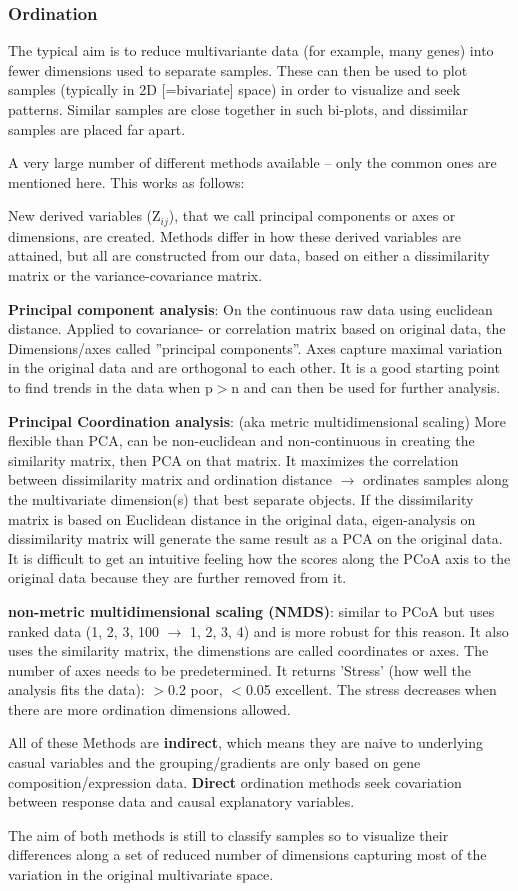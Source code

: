 \documentclass{article}
\begin{document}
\subsubsection{Ordination}
The typical aim is to reduce multivariante data (for example, many genes) into fewer dimensions used to separate samples. These can then be used to plot samples (typically in 2D [=bivariate] space) in order to visualize and seek patterns. Similar samples are close together in such bi-plots, and dissimilar samples are placed far apart. \par
A very large number of different methods available – only the common ones are mentioned here.
This works as follows:\par 
New derived variables (Z$_{ij}$), that we call principal components or axes or dimensions, are created. Methods differ in how these derived variables are attained, but all are constructed from our data, based on either a dissimilarity matrix or the variance-covariance matrix.\par
\textbf{Principal component analysis}: On the continuous raw data using euclidean distance. Applied to covariance- or correlation matrix based on original data, the Dimensions/axes called ”principal components”. Axes capture maximal variation in the original data and are orthogonal to each other.
It is a good starting point to find trends in the data when p$>$n and can then be used for further analysis.\par
\textbf{Principal Coordination analysis}: (aka metric multidimensional scaling) More flexible than PCA, can be non-euclidean and non-continuous in creating the similarity matrix, then PCA on that matrix. It maximizes the correlation between dissimilarity matrix and ordination distance $\rightarrow$ ordinates samples along the multivariate dimension(s) that best separate objects. If the dissimilarity matrix is based on Euclidean distance in the original data, eigen-analysis on dissimilarity matrix will generate the same result as a PCA on the original data. It is difficult to get an intuitive feeling how the scores along the PCoA axis to the original data because they are further removed from it.\par
\textbf{non-metric multidimensional scaling (NMDS)}: similar to PCoA but uses ranked data (1, 2, 3, 100 $\rightarrow$ 1, 2, 3, 4) and is more robust for this reason. It also uses the similarity matrix, the dimenstions are called coordinates or axes. The number of axes needs to be predetermined. It returns 'Stress' (how well the analysis fits the data): $>$0.2 poor, $<$0.05 excellent. The stress decreases when there are more ordination dimensions allowed.\par
\vspace{0.3cm}
All of these Methods are \textbf{indirect}, which means they are naive to underlying casual variables and the grouping/gradients are only based on gene composition/expression data. \textbf{Direct} ordination methods seek covariation between response data and causal explanatory variables.\par 
The aim of both methods is still to classify samples so to visualize their differences along a set of reduced number of dimensions capturing most of the variation in the original multivariate space.
\end{document}
